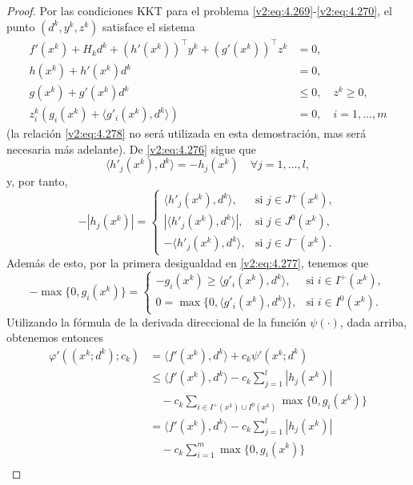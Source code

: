 \begin{proof}
    Por las condiciones KKT para el problema \eqref{v2:eq:4.269}-\eqref{v2:eq:4.270}, el punto $(d^k, y^k, z^k)$ satisface el sistema
    \begin{align}
        f'(x^k) + H_k d^k + (h'(x^k))^\top y^k + (g'(x^k))^\top z^k &= 0, \label{v2:eq:4.275} \\
        h(x^k) + h'(x^k)d^k &= 0, \label{v2:eq:4.276} \\
        g(x^k) + g'(x^k)d^k &\le 0, \quad z^k \ge 0, \label{v2:eq:4.277} \\
        z_i^k(g_i(x^k) + \langle g'_i(x^k), d^k \rangle) &= 0, \quad i = 1, \dots, m \label{v2:eq:4.278}
    \end{align}
    (la relación \eqref{v2:eq:4.278} no será utilizada en esta demostración, mas será necesaria más adelante). De \eqref{v2:eq:4.276} sigue que
    \[
        \langle h'_j(x^k), d^k \rangle = -h_j(x^k) \quad \forall j = 1, \dots, l,
    \]
    y, por tanto,
    \[
        -|h_j(x^k)| = \begin{cases}
            \langle h'_j(x^k), d^k \rangle, & \text{si } j \in J^+(x^k), \\
            |\langle h'_j(x^k), d^k \rangle|, & \text{si } j \in J^0(x^k), \\
            -\langle h'_j(x^k), d^k \rangle, & \text{si } j \in J^-(x^k).
        \end{cases}
    \]
    Además de esto, por la primera desigualdad en \eqref{v2:eq:4.277}, tenemos que
    \[
        -\max\{0, g_i(x^k)\} = \begin{cases}
            -g_i(x^k) \ge \langle g'_i(x^k), d^k \rangle, & \text{si } i \in I^+(x^k), \\
            0 = \max\{0, \langle g'_i(x^k), d^k \rangle\}, & \text{si } i \in I^0(x^k).
        \end{cases}
    \]
    Utilizando la fórmula de la derivada direccional de la función $\psi(\cdot)$, dada arriba, obtenemos entonces
    \begin{align*}
        \varphi'((x^k; d^k); c_k) &= \langle f'(x^k), d^k \rangle + c_k\psi'(x^k; d^k) \\
        &\le \langle f'(x^k), d^k \rangle - c_k\sum_{j=1}^l |h_j(x^k)| \\
        &\quad - c_k\sum_{i \in I^+(x^k) \cup I^0(x^k)} \max\{0, g_i(x^k)\} \\
        &= \langle f'(x^k), d^k \rangle - c_k\sum_{j=1}^l |h_j(x^k)| \\
        &\quad - c_k\sum_{i=1}^m \max\{0, g_i(x^k)\} \\

\end{align*}
\end{proof}
